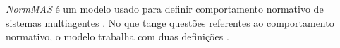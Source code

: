 \textit{NormMAS} é um modelo usado para definir comportamento normativo de sistemas multiagentes \cite{normas}. No que tange questões referentes ao comportamento normativo, o modelo trabalha com duas definições \cite{normas}.

